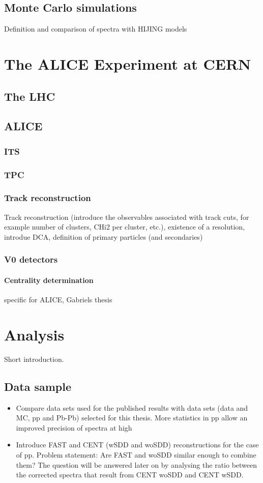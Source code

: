 \documentclass[12pt,a4paper]{report}
\begin{document}
\section{Monte Carlo simulations}
Definition and comparison of spectra with HIJING models

\chapter{The ALICE Experiment at CERN} 
\section{The LHC}
\section{ALICE}
\subsection{ITS}
\subsection{TPC}
\subsection{Track reconstruction}
Track reconstruction (introduce the observables associated with track cuts, for example number of clusters, CHi2 per cluster, etc.), existence of a \pt resolution, introdue DCA, definition of primary particles (and secondaries)
\subsection{V0 detectors}
\subsubsection{Centrality determination}
specific for ALICE, Gabriels thesis

\chapter{Analysis}
Short introduction.
\section{Data sample}
\begin{itemize}
\item Compare data sets used for the published results with data sets (data and MC, pp and Pb-Pb) selected for this thesis. More statistics in pp allow an improved precision of \pt spectra at high \pt
\item Introduce FAST and CENT (wSDD and woSDD) reconstructions for the case of pp. Problem statement: Are FAST and woSDD similar enough to combine them?  The question will be answered later on by analysing the ratio between the corrected \pt spectra that result from CENT woSDD and CENT wSDD.
\end{itemize}
\end{document}
